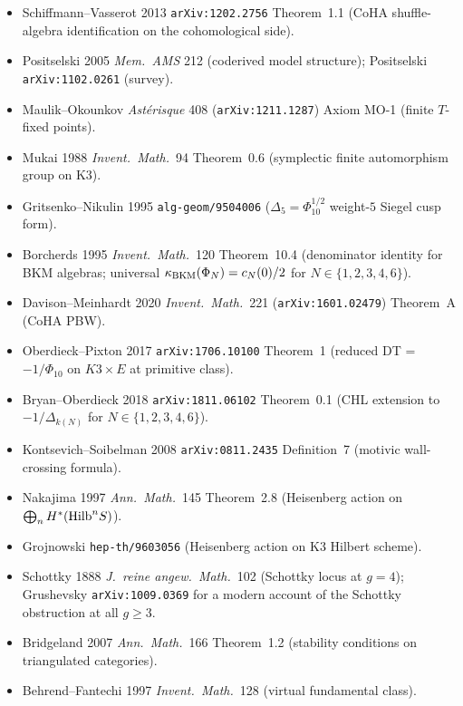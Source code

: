 \begin{itemize}[leftmargin=1.5em]
\item Schiffmann--Vasserot 2013 \texttt{arXiv:1202.2756} Theorem~1.1
(CoHA shuffle-algebra identification on the cohomological side).
\item Positselski 2005 \emph{Mem.\ AMS} 212 (coderived model
structure); Positselski \texttt{arXiv:1102.0261} (survey).
\item Maulik--Okounkov \emph{Ast\'erisque} 408
(\texttt{arXiv:1211.1287}) Axiom MO-1 (finite $T$-fixed points).
\item Mukai 1988 \emph{Invent.\ Math.}\ 94 Theorem~0.6 (symplectic
finite automorphism group on K$3$).
\item Gritsenko--Nikulin 1995 \texttt{alg-geom/9504006}
($\Delta_5 = \Phi_{10}^{1/2}$ weight-$5$ Siegel cusp form).
\item Borcherds 1995 \emph{Invent.\ Math.}\ 120 Theorem~10.4
(denominator identity for BKM algebras; universal
$\kappa_{\mathrm{BKM}}(\Phi_N) = c_N(0)/2$ for $N \in \{1, 2, 3, 4, 6\}$).
\item Davison--Meinhardt 2020 \emph{Invent.\ Math.}\ 221
(\texttt{arXiv:1601.02479}) Theorem~A (CoHA PBW).
\item Oberdieck--Pixton 2017 \texttt{arXiv:1706.10100} Theorem~1
(reduced DT = $-1/\Phi_{10}$ on $K3 \times E$ at primitive class).
\item Bryan--Oberdieck 2018 \texttt{arXiv:1811.06102} Theorem~0.1
(CHL extension to $-1/\Delta_{k(N)}$ for $N \in \{1, 2, 3, 4, 6\}$).
\item Kontsevich--Soibelman 2008 \texttt{arXiv:0811.2435}
Definition~7 (motivic wall-crossing formula).
\item Nakajima 1997 \emph{Ann.\ Math.}\ 145 Theorem~2.8
(Heisenberg action on $\bigoplus_n H^*(\mathrm{Hilb}^n S)$).
\item Grojnowski \texttt{hep-th/9603056} (Heisenberg action on
K$3$ Hilbert scheme).
\item Schottky 1888 \emph{J.\ reine angew.\ Math.}\ 102 (Schottky
locus at $g = 4$); Grushevsky \texttt{arXiv:1009.0369} for a
modern account of the Schottky obstruction at all $g \geq 3$.
\item Bridgeland 2007 \emph{Ann.\ Math.}\ 166 Theorem~1.2
(stability conditions on triangulated categories).
\item Behrend--Fantechi 1997 \emph{Invent.\ Math.}\ 128 (virtual
fundamental class).
\end{itemize}

